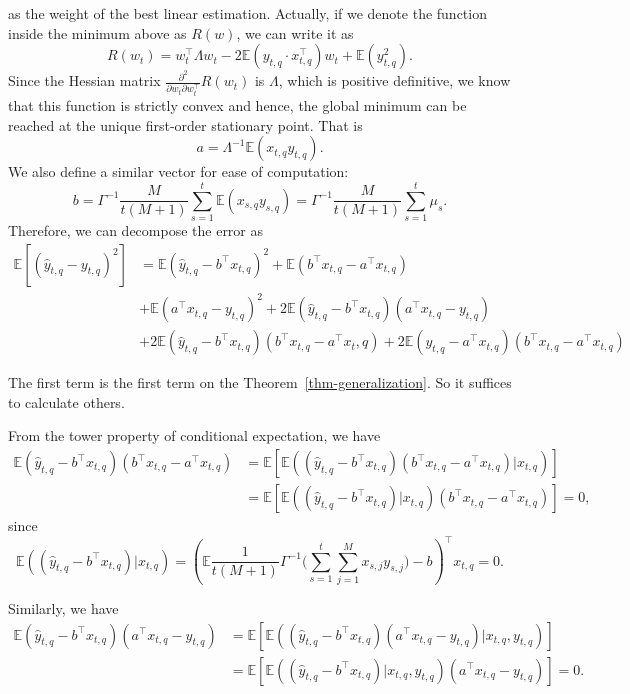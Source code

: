 \documentclass{article}
\theoremstyle{plain}
\theoremstyle{definition}
\theoremstyle{remark}
\begin{document}
as the weight of the best linear estimation. Actually, if we denote the function inside the minimum above as $R(w)$, we can write it as 
\[
R(w_t) = w_t^\top \Lambda w_t - 2\mathbb{E}(y_{t,q}\cdot x_{t,q}^\top)w_t + \mathbb{E}(y_{t,q}^2).
\]
Since the Hessian matrix $ \frac{\partial^2}{\partial w_t\partial w_t^\top}R(w_t) $ is $\Lambda$, which is positive definitive, we know that this function is strictly convex and hence, the global minimum can be reached at the unique first-order stationary point. That is 
\[
a = \Lambda^{-1}\mathbb{E}(x_{t,q}y_{t,q}).
\]
We also define a similar vector for ease of computation:
\[
 b =  \Gamma^{-1}\frac{M}{t(M+1)}\sum_{s=1}^t \mathbb{E}(x_{s,q}y_{s,q}) = \Gamma^{-1}\frac{M}{t(M+1)}\sum_{s=1}^t\mu_s.
\]
Therefore, we can decompose the error as 
\begin{align*}
    \mathbb{E}[(\hat y_{t,q}-y_{t,q})^2]& = \mathbb{E}(\hat{y}_{t,q} - b^\top x_{t,q})^2 +\mathbb{E}(b^\top x_{t,q} - a^\top x_{t,q}) \\
    &+ \mathbb{E}(a^\top x_{t,q} - y_{t,q})^2 + 2\mathbb{E}(\hat{y}_{t,q} - b^\top x_{t,q})(a^\top x_{t,q} - y_{t,q})\\
    &+2\mathbb{E}(\hat{y}_{t,q} - b^\top x_{t,q})(b^\top x_{t,q}-a^\top x_t,q) + 2\mathbb{E}(y_{t,q} - a^\top x_{t,q})(b^\top x_{t,q}-a^\top x_{t,q})
\end{align*}

The first term is the first term on the Theorem~\ref{thm-generalization}. So it suffices to calculate others.

From the tower property of conditional expectation, we have
\begin{align*}
  \mathbb{E}(\hat{y}_{t,q} - b^\top x_{t,q})(b^\top x_{t,q}-a^\top x_{t,q}) &= \mathbb{E}\left[\mathbb{E}\left((\hat{y}_{t,q} - b^\top x_{t,q})(b^\top x_{t,q}-a^\top x_{t,q})|x_{t,q}\right) \right] \\
  &=\mathbb{E}\left[\mathbb{E}\left((\hat{y}_{t,q} - b^\top x_{t,q})|x_{t,q}\right)(b^\top x_{t,q}-a^\top x_{t,q}) \right]=0,
\end{align*}
since\[
\mathbb{E}\left((\hat{y}_{t,q} - b^\top x_{t,q})|x_{t,q}\right) = \left(\mathbb{E}\frac{1}{t(M+1)}\Gamma^{-1}
\Big(\sum_{s=1}^t \sum_{j=1}^M x_{s,j}y_{s,j}\Big)-b\right)^\top x_{t,q}=0.
\]

Similarly, we have \begin{align*}
\mathbb{E}(\hat{y}_{t,q} - b^\top x_{t,q})(a^\top x_{t,q} - y_{t,q}) &= \mathbb{E}\left[\mathbb{E}\left((\hat{y}_{t,q} - b^\top x_{t,q})(a^\top x_{t,q} - y_{t,q})|x_{t,q},y_{t,q}\right)\right]\\
&=\mathbb{E}\left[\mathbb{E}\left((\hat{y}_{t,q} - b^\top x_{t,q})|x_{t,q},y_{t,q}\right)(a^\top x_{t,q} - y_{t,q})\right]=0.
\end{align*}
\end{document}
